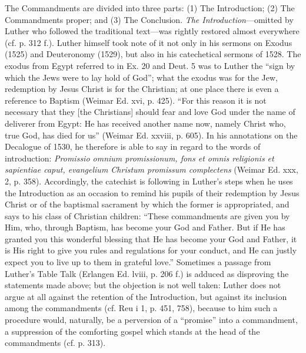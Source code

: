 The Commandments are divided into three parts: (1) The Introduction; (2) The Commandments proper; and (3) The Conclusion. \emph{The Introduction}—omitted by Luther who followed the traditional text—was rightly restored almost everywhere (cf. p. 312 f.). Luther himself took note of it not only in his sermons on Exodus (1525) and Deuteronomy (1529), but also in his catechetical sermons of 1528. The exodus from Egypt referred to in Ex. 20 and Deut. 5 was to Luther the “sign by which the Jews were to lay hold of God”; what the exodus was for the Jew, redemption by Jesus Christ is for the Christian; at one place there is even a reference to Baptism (Weimar Ed. xvi, p. 425). “For this reason it is not necessary that they [the Christians] should fear and love God under the name of deliverer from Egypt: He has received another name now, namely Christ who, true God, has died for us” (Weimar Ed. xxviii, p. 605). In his annotations on the Decalogue of 1530, he therefore is able to say in regard to the words of introduction: \emph{Promissio omnium promissionum, fons et omnis religionis et sapientiae caput, evangelium Christum promissum complectens} (Weimar Ed. xxx, 2, p. 358). Accordingly, the catechist is following in Luther’s steps when he uses the Introduction as an occasion to remind his pupils of their redemption by Jesus Christ or of the baptismal sacrament by which the former is appropriated, and says to his class of Christian children: “These commandments are given you by Him, who, through Baptism, has become your God and Father. But if He has granted you this wonderful blessing that He has become your God and Father, it is His right to give you rules and regulations for your conduct, and He can justly expect you to live up to them in grateful love.” Sometimes a passage from Luther’s Table Talk (Erlangen Ed. lviii, p. 206 f.) is adduced as disproving the statements made above;
but the objection is not well taken: Luther does not argue at all against the retention of the Introduction, but against its inclusion among the commandments (cf. Reu i 1, p. 451, 758), because to him such a procedure would, naturally, be a perversion of a “promise” into a commandment, a suppression of the comforting gospel which stands at the head of the commandments (cf. p. 313).

